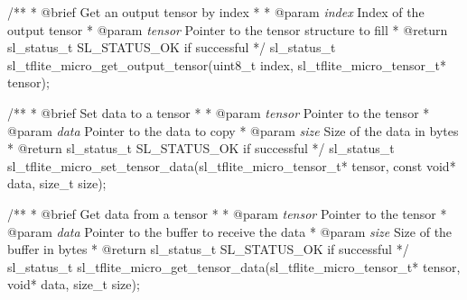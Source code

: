 \documentclass[
  9pt,
  letterpaper,
  abstract,
  titlepage]{scrbook}
\newenvironment{Shaded}{\begin{snugshade}}{\end{snugshade}}
\newcommand{\AnnotationTok}[1]{\textcolor[rgb]{0.37,0.37,0.37}{#1}}
\newcommand{\CommentTok}[1]{\textcolor[rgb]{0.37,0.37,0.37}{#1}}
\newcommand{\CommentVarTok}[1]{\textcolor[rgb]{0.37,0.37,0.37}{\textit{#1}}}
\newcommand{\DataTypeTok}[1]{\textcolor[rgb]{0.68,0.00,0.00}{#1}}
\newcommand{\NormalTok}[1]{\textcolor[rgb]{0.00,0.23,0.31}{#1}}
\newcommand{\OperatorTok}[1]{\textcolor[rgb]{0.37,0.37,0.37}{#1}}
\begin{document}
\begin{Shaded}
\begin{Highlighting}[]
\CommentTok{/**}
\CommentTok{ * }\AnnotationTok{@brief}\CommentTok{ Get an output tensor by index}
\CommentTok{ * }
\CommentTok{ * }\AnnotationTok{@param}\CommentTok{ }\CommentVarTok{index}\CommentTok{ Index of the output tensor}
\CommentTok{ * }\AnnotationTok{@param}\CommentTok{ }\CommentVarTok{tensor}\CommentTok{ Pointer to the tensor structure to fill}
\CommentTok{ * }\AnnotationTok{@return}\CommentTok{ sl\_status\_t SL\_STATUS\_OK if successful}
\CommentTok{ */}
\NormalTok{sl\_status\_t sl\_tflite\_micro\_get\_output\_tensor}\OperatorTok{(}\DataTypeTok{uint8\_t}\NormalTok{ index}\OperatorTok{,}\NormalTok{ sl\_tflite\_micro\_tensor\_t}\OperatorTok{*}\NormalTok{ tensor}\OperatorTok{);}

\CommentTok{/**}
\CommentTok{ * }\AnnotationTok{@brief}\CommentTok{ Set data to a tensor}
\CommentTok{ * }
\CommentTok{ * }\AnnotationTok{@param}\CommentTok{ }\CommentVarTok{tensor}\CommentTok{ Pointer to the tensor}
\CommentTok{ * }\AnnotationTok{@param}\CommentTok{ }\CommentVarTok{data}\CommentTok{ Pointer to the data to copy}
\CommentTok{ * }\AnnotationTok{@param}\CommentTok{ }\CommentVarTok{size}\CommentTok{ Size of the data in bytes}
\CommentTok{ * }\AnnotationTok{@return}\CommentTok{ sl\_status\_t SL\_STATUS\_OK if successful}
\CommentTok{ */}
\NormalTok{sl\_status\_t sl\_tflite\_micro\_set\_tensor\_data}\OperatorTok{(}\NormalTok{sl\_tflite\_micro\_tensor\_t}\OperatorTok{*}\NormalTok{ tensor}\OperatorTok{,} 
                                          \DataTypeTok{const} \DataTypeTok{void}\OperatorTok{*}\NormalTok{ data}\OperatorTok{,} 
                                          \DataTypeTok{size\_t}\NormalTok{ size}\OperatorTok{);}

\CommentTok{/**}
\CommentTok{ * }\AnnotationTok{@brief}\CommentTok{ Get data from a tensor}
\CommentTok{ * }
\CommentTok{ * }\AnnotationTok{@param}\CommentTok{ }\CommentVarTok{tensor}\CommentTok{ Pointer to the tensor}
\CommentTok{ * }\AnnotationTok{@param}\CommentTok{ }\CommentVarTok{data}\CommentTok{ Pointer to the buffer to receive the data}
\CommentTok{ * }\AnnotationTok{@param}\CommentTok{ }\CommentVarTok{size}\CommentTok{ Size of the buffer in bytes}
\CommentTok{ * }\AnnotationTok{@return}\CommentTok{ sl\_status\_t SL\_STATUS\_OK if successful}
\CommentTok{ */}
\NormalTok{sl\_status\_t sl\_tflite\_micro\_get\_tensor\_data}\OperatorTok{(}\NormalTok{sl\_tflite\_micro\_tensor\_t}\OperatorTok{*}\NormalTok{ tensor}\OperatorTok{,} 
                                          \DataTypeTok{void}\OperatorTok{*}\NormalTok{ data}\OperatorTok{,} 
                                          \DataTypeTok{size\_t}\NormalTok{ size}\OperatorTok{);}


\end{Highlighting}
\end{Shaded}
\end{document}
